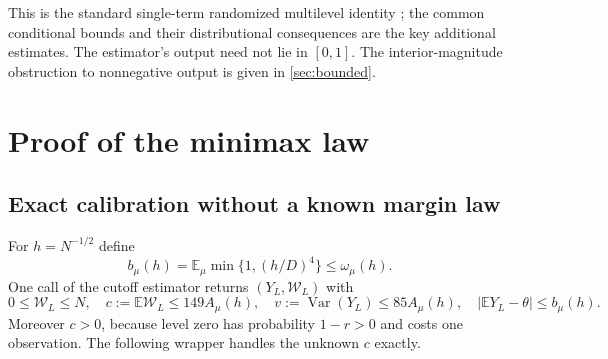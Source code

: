 \documentclass[11pt,a4paper]{article}
\theoremstyle{definition}
\newcommand{\E}{\mathbb E}
\newcommand{\Var}{\operatorname{Var}}
\newcommand{\om}{\omega_\mu}
\newcommand{\Am}{A_\mu}
\begin{document}
This is the standard single-term randomized multilevel identity
\cite{vihola}; the common conditional bounds and their distributional
consequences are the key additional estimates. The estimator's output need
not lie in $[0,1]$. The interior-magnitude obstruction to nonnegative output is
given in \cref{sec:bounded}.

\section{Proof of the minimax law}\label{sec:minimax-proof}
\subsection{Exact calibration without a known margin law}
For $h=N^{-1/2}$ define
\begin{equation}\label{eq:bias-functional}
 b_\mu(h)=\E_\mu\min\{1,(h/D)^4\}\le\om(h).
\end{equation}
One call of the cutoff estimator returns $(Y_L,\mathcal W_L)$ with
\begin{equation}\label{eq:one-call}
 0\le\mathcal W_L\le N,\quad c:=\E\mathcal W_L\le149\Am(h),\quad
 v:=\Var(Y_L)\le85\Am(h),\quad |\E Y_L-\theta|\le b_\mu(h).
\end{equation}
Moreover $c>0$, because level zero has probability $1-r>0$ and costs one
observation. The following wrapper handles the unknown $c$ exactly.
\end{document}
